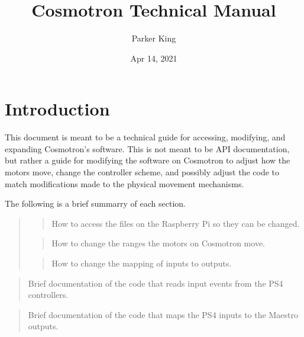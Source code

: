 \documentclass[letterpaper,10pt,english]{sphinxmanual}
\title{Cosmotron Technical Manual}
\date{Apr 14, 2021}
\author{Parker King}
\begin{document}
\pagestyle{empty}
\sphinxmaketitle
\pagestyle{plain}
\sphinxtableofcontents
\pagestyle{normal}
\label{\detokenize{index::doc}}



\chapter{Introduction}
\label{\detokenize{intro:introduction}}\label{\detokenize{intro::doc}}
\sphinxAtStartPar
This document is meant to be a technical guide for accessing,
modifying, and expanding Cosmotron’s software. This is not meant
to be API documentation, but rather a guide for modifying the
software on Cosmotron to adjust how the motors move, change the
controller scheme, and possibly adjust the code to match
modifications made to the physical movement mechanisms.

\sphinxAtStartPar
The following is a brief summarry of each section.

\sphinxAtStartPar
{}
\begin{quote}

\sphinxAtStartPar
{}
\begin{quote}

\sphinxAtStartPar
How to access the files on the Raspberry Pi so they can be changed.
\end{quote}

\sphinxAtStartPar
{}
\begin{quote}

\sphinxAtStartPar
How to change the ranges the motors on Cosmotron move.
\end{quote}

\sphinxAtStartPar
{}
\begin{quote}

\sphinxAtStartPar
How to change the mapping of inputs to outputs.
\end{quote}
\end{quote}

\sphinxAtStartPar
{}
\begin{quote}

\sphinxAtStartPar
Brief documentation of the code that reads input events from the PS4 controllers.
\end{quote}

\sphinxAtStartPar
{}
\begin{quote}

\sphinxAtStartPar
Brief documentation of the code that maps the PS4 inputs to the Maestro outputs.
\end{quote}
\end{document}
